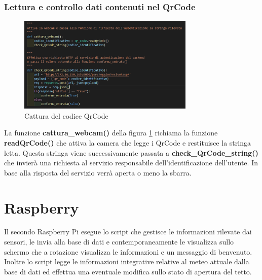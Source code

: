 \documentclass[a4paper,11pt]{report}
\begin{document}
\subsubsection{Lettura e controllo dati contenuti nel QrCode}
\begin{figure}[H]
	\centering
	\includegraphics[width=0.75\textwidth]{figure/cattura_qrCode.jpg}
	\caption{Cattura del codice QrCode}
	\label{catturaQr}
\end{figure}
La funzione \textbf{cattura\_webcam()} della figura \ref{catturaQr} richiama la funzione \textbf{readQrCode()} che attiva la camera che legge i QrCode e restituisce la stringa letta. 
Questa stringa viene successivamente passata a \textbf{check\_QrCode\_string()} che invierà una richiesta al servizio responsabile dell'identificazione dell'utente. In base alla risposta del servizio verrà aperta o meno la sbarra.


\section{Raspberry}
Il secondo Raspberry Pi esegue lo script che gestisce le informazioni rilevate dai sensori, le invia alla base di dati e contemporaneamente le visualizza sullo schermo che a rotazione visualizza le informazioni e un messaggio di benvenuto. Inoltre lo script legge le informazioni integrative relative al meteo attuale dalla base di dati ed effettua una eventuale modifica sullo stato di apertura del tetto.
\end{document}
